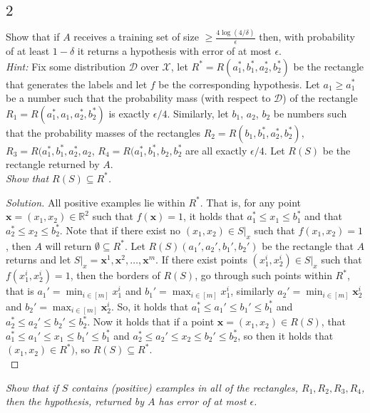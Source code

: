 \documentclass[10pt, a4paper, twoside]{amsart}
\newcommand{\R}{\ensuremath{\mathbb{R}}}
\newenvironment{solution}
               {\let\oldqedsymbol=\qedsymbol
                \renewcommand{\qedsymbol}{$\blacktriangleleft$}
                \begin{proof}[Solution]}
               {\end{proof}
                \renewcommand{\qedsymbol}{\oldqedsymbol}}
\begin{document}
\subsection*{$2$}
Show that if $A$ receives a training set of size $\geq \frac{4 \log (4/\delta)}{\epsilon}$ then, with probability of at least $1-\delta$ it returns a hypothesis with error  of at most $\epsilon$.\\
\textit{Hint:} Fix some distribution $\mathcal{D}$ over $\mathcal{X}$, let $R^* = R(a_1^*,b_1^*,a_2^*,b_2^*)$ be the rectangle that generates the labels and let $f$ be the corresponding hypothesis. Let $a_1 \geq a_1^*$ be a number such that the probability mass (with respect to $\mathcal{D}$) of the rectangle $R_1 = R(a_1^*,a_1,a_2^*,b_2^*)$ is exactly $\epsilon/4$. Similarly, let $b_1$, $a_2$, $b_2$ be numbers such that the probability masses of the rectangles $R_2 = R(b_1,b_1^*,a_2^*,b_2^*)$, $R_3 =  R(a_1^*,b_1^*,a_2^*,a_2$, $R_4 =  R(a_1^*,b_1^*,b_2,b_2^*$ are all exactly $\epsilon/4$. Let $R(S)$ be the rectangle returned by $A$.\\
\textit{Show that $R(S)\subseteq R^*$.}
\begin{solution}
All positive examples lie within $R^*$. That is, for any point $\mathbf{x} = (x_1,x_2) \in \R^2$ such that $f(\mathbf{x})=1$, it holds that $a_1^*\leq x_1 \leq b_1^*$ and that $a_2^*\leq x_2 \leq b_2^*$. Note that if there exist no $(x_1,x_2) \in S|_x$ such that $f(x_1,x_2)=1$, then $A$ will return $\emptyset \subseteq R^*$. Let $R(S)(a_1',a_2',b_1',b_2')$ be the rectangle that $A$ returns and let $S|_x = {\mathbf{x}^1, \mathbf{x}^2,\ldots, \mathbf{x}^m}$. If there exist points $(x^i_1,x^i_2)\in S|_x$ such that $f(x^i_1,x^i_2)=1$, then the borders of $R(S)$, go through such points within $R^*$, that is $a_1' = \min_{i\in [m]} x^i_1$ and $b_1' = \max_{i\in [m]} x^i_1$, similarly $a_2' = \min_{i\in [m]} \mathbf{x}^i_2$ and $b_2' = \max_{i\in [m]} \mathbf{x}^i_2$. So, it holds that $a_1^*\leq a_1'\leq b_1' \leq b_1^*$ and $a_2^* \leq a_2' \leq b_2' \leq b_2^*$. Now it holds that if a point $\mathbf{x} = (x_1, x_2)\in R(S)$, that $a_1^*\leq a_1'\leq x_1 \leq b_1' \leq b_1^*$ and $a_2^* \leq a_2'\leq x_2 \leq b_2' \leq b_2^*$, so then it holds that $(x_1,x_2) \in R^*)$, so $R(S) \subseteq R^*$.\\
\end{solution}
\textit{Show that if $S$ contains (positive) examples in all of the rectangles, $R_1, R_2, R_3, R_4$, then the hypothesis, returned by $A$ has error of at most $\epsilon$.} \\
\end{document}
